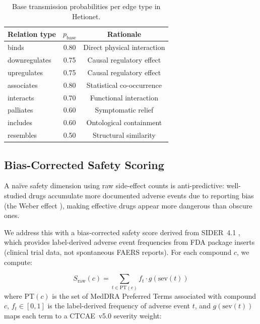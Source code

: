 \documentclass[11pt,a4paper]{article}
\begin{document}
\begin{table}[t]
\centering
\caption{Base transmission probabilities per edge type in Hetionet.}
\label{tab:edge_probs}
\begin{tabular}{lcc}
\toprule
\textbf{Relation type} & $p_\text{base}$ & \textbf{Rationale} \\
\midrule
binds & 0.80 & Direct physical interaction \\
downregulates & 0.75 & Causal regulatory effect \\
upregulates & 0.75 & Causal regulatory effect \\
associates & 0.80 & Statistical co-occurrence \\
interacts & 0.70 & Functional interaction \\
palliates & 0.60 & Symptomatic relief \\
includes & 0.60 & Ontological containment \\
resembles & 0.50 & Structural similarity \\
\bottomrule
\end{tabular}
\end{table}

\subsection{Bias-Corrected Safety Scoring}
\label{sec:methods:safety}

A na\"ive safety dimension using raw side-effect counts is
anti-predictive: well-studied drugs accumulate more documented adverse
events due to reporting bias (the Weber effect
\citep{weber1984epidemiology}), making effective drugs appear more
dangerous than obscure ones.

We address this with a bias-corrected safety score derived from
SIDER~4.1 \citep{kuhn2016sider}, which provides label-derived
adverse event frequencies from FDA package inserts (clinical trial data,
not spontaneous FAERS reports). For each compound $c$, we compute:

\begin{equation}
    S_\text{raw}(c) = \sum_{t \in \text{PT}(c)}
    f_t \cdot g(\text{sev}(t))
    \label{eq:safety_raw}
\end{equation}
where $\text{PT}(c)$ is the set of MedDRA Preferred Terms associated
with compound $c$, $f_t \in [0, 1]$ is the label-derived frequency of
adverse event $t$, and $g(\text{sev}(t))$ maps each term to a CTCAE~v5.0
\citep{ctcae2017} severity weight:
\end{document}
